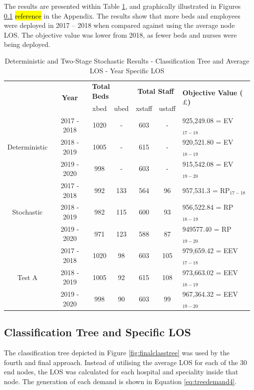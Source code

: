 \documentclass[../thesis.tex]{subfiles}
\begin{document}
The results are presented within Table \ref{tab:Results8}, and graphically illustrated in Figures \ref{} \hl{reference} in the Appendix. The results show that more beds and employees were deployed in 2017 – 2018 when compared against using the average node LOS. The objective value was lower from 2018, as fewer beds and nurses were being deployed.

\begin{table}[h!]
    \centering
    \begin{tabular}{ccccccl}\toprule
 & \multirow{2}{*}{\textbf{Year}}& \multicolumn{2}{l}{\textbf{Total Beds}} & \multicolumn{2}{c}{\textbf{Total Staff}} & \multirow{2}{*}{\textbf{Objective Value ($\pounds$)}}\\ \cmidrule(lr){3-4} \cmidrule(lr){5-6}
&& xbed           & ubed          & xstaff         & ustaff         \\ \midrule
     \multirow{3}{*}{Deterministic} & 2017 - 2018 & 1020  & - &  603 & - &925,249.08 =  EV$_{17-18}$ \\ 
      & 2018 - 2019 & 1005& - & 615 & - & 920,521.80 =  EV$_{18-19}$ \\
      & 2019 - 2020 &  998 & - & 603 & - & 915,542.08 =  EV$_{19-20}$\\ \midrule
     \multirow{3}{*}{Stochastic} & 2017 - 2018 & 992 & 133 & 564 & 96 &957,531.3   = RP$_{17-18}$ \\ 
      & 2018 - 2019 &  982 & 115 & 600  & 93 & 956,522.84 =  RP$_{18-19}$ \\
      & 2019 - 2020 & 971 & 123 & 588 & 87 & 949577.40 =  RP$_{19-20}$\\ \midrule    
     \multirow{3}{*}{Test A} & 2017 - 2018 & 1020 & 98 & 603  & 105 & 979,659.42 = EEV$_{17-18}$ \\ 
      & 2018 - 2019&1005  & 92 & 615  & 108 &973,663.02 =  EEV$_{18-19}$ \\
      & 2019 - 2020 & 998 & 90  & 603 & 99 & 967,364.32 = EEV$_{19-20}$\\ \bottomrule       
    \end{tabular}
    \caption{Deterministic and Two-Stage Stochastic Results - Classification Tree and Average LOS - Year Specific LOS}
    \label{tab:Results8}
\end{table}

\subsection{Classification Tree and Specific LOS}
The classification tree depicted in Figure \ref{fig:finalclasstree} was used by the fourth and final approach. Instead of utilising the average LOS for each of the 30 end nodes, the LOS was calculated for each hospital and speciality inside that node. The generation of each demand is shown in Equation \eqref{eq:treedemand4}.
\end{document}
